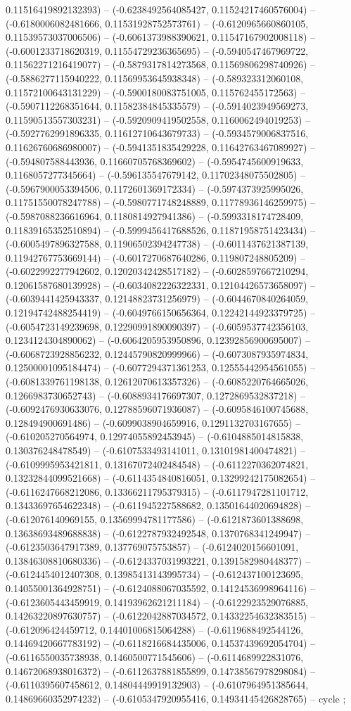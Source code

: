 0.11516419892132393) -- (-0.6238492564085427, 0.11524217460576004) -- (-0.6180006082481666, 0.11531928752573761) -- (-0.6120965660860105, 0.11539573037006506) -- (-0.6061373988390621, 0.11547167902008118) -- (-0.6001233718620319, 0.11554729236365695) -- (-0.5940547467969722, 0.11562271216419077) -- (-0.5879317814273568, 0.11569806298740926) -- (-0.5886277115940222, 0.11569953645938348) -- (-0.589323312060108, 0.11572100643131229) -- (-0.5900180083751005, 0.115762455172563) -- (-0.5907112268351644, 0.11582384845335579) -- (-0.5914023949569273, 0.11590513557303231) -- (-0.5920909419502558, 0.1160062494019253) -- (-0.5927762991896335, 0.11612710643679733) -- (-0.5934579006837516, 0.11626760686980007) -- (-0.5941351835429228, 0.11642763467089927) -- (-0.594807588443936, 0.11660705768369602) -- (-0.5954745600919633, 0.1168057277345664) -- (-0.596135547679142, 0.11702348075502805) -- (-0.5967900053394506, 0.1172601369172334) -- (-0.5974373925995026, 0.11751550078247788) -- (-0.5980771748248889, 0.11778936146259975) -- (-0.5987088236616964, 0.1180814927941386) -- (-0.5993318174728409, 0.11839165352510894) -- (-0.5999456417688526, 0.11871958751423434) -- (-0.6005497896327588, 0.11906502394247738) -- (-0.6011437621387139, 0.11942767753669144) -- (-0.6017270687640286, 0.119807248805209) -- (-0.6022992277942602, 0.12020342428517182) -- (-0.6028597667210294, 0.12061587680139928) -- (-0.6034082226322331, 0.12104426573658097) -- (-0.6039441425943337, 0.12148823731256979) -- (-0.6044670840264059, 0.12194742488254419) -- (-0.6049766150656364, 0.12242144923379725) -- (-0.6054723149239698, 0.12290991890090397) -- (-0.6059537742356103, 0.1234124304890062) -- (-0.6064205953950896, 0.12392856900695007) -- (-0.6068723928856232, 0.12445790820999966) -- (-0.6073087935974834, 0.12500001095184474) -- (-0.6077294371361253, 0.12555442954561055) -- (-0.6081339761198138, 0.12612070613357326) -- (-0.6085220764665026, 0.1266983730652743) -- (-0.6088934176697307, 0.1272869532837218) -- (-0.6092476930633076, 0.12788596071936087) -- (-0.6095846100745688, 0.128494900691486) -- (-0.6099038904659916, 0.1291132703167655) -- (-0.610205270564974, 0.12974055892453945) -- (-0.6104885014815838, 0.130376248478549) -- (-0.6107533493141011, 0.13101981400474821) -- (-0.6109995953421811, 0.13167072402484548) -- (-0.6112270362074821, 0.13232844099521668) -- (-0.6114354840816051, 0.13299242175082654) -- (-0.6116247668212086, 0.13366211795379315) -- (-0.6117947281101712, 0.13433697654622348) -- (-0.611945227588682, 0.13501644020694828) -- (-0.612076140969155, 0.13569994781177586) -- (-0.6121873601388698, 0.13638693489688838) -- (-0.6122787932492548, 0.1370768341249947) -- (-0.6123503647917389, 0.137769075753857) -- (-0.6124020156601091, 0.13846308810680336) -- (-0.6124337031993221, 0.1391582980448377) -- (-0.6124454012407308, 0.13985413143995734) -- (-0.612437100123695, 0.14055001364928751) -- (-0.6124088067035592, 0.14124536998964116) -- (-0.6123605443459919, 0.14193962621211184) -- (-0.6122923529076885, 0.14263220897630757) -- (-0.6122042887034572, 0.14332254632383515) -- (-0.612096424459712, 0.14401006815064288) -- (-0.6119688492544126, 0.14469420667783192) -- (-0.6118216684435006, 0.14537439692054704) -- (-0.6116550035738938, 0.1460500771545606) -- (-0.6114689922831076, 0.14672068938016372) -- (-0.6112637881855899, 0.14738567978298084) -- (-0.6110395607458612, 0.14804449919132903) -- (-0.6107964951385644, 0.14869660352974232) -- (-0.6105347920955416, 0.14934145426828765) -- cycle
;